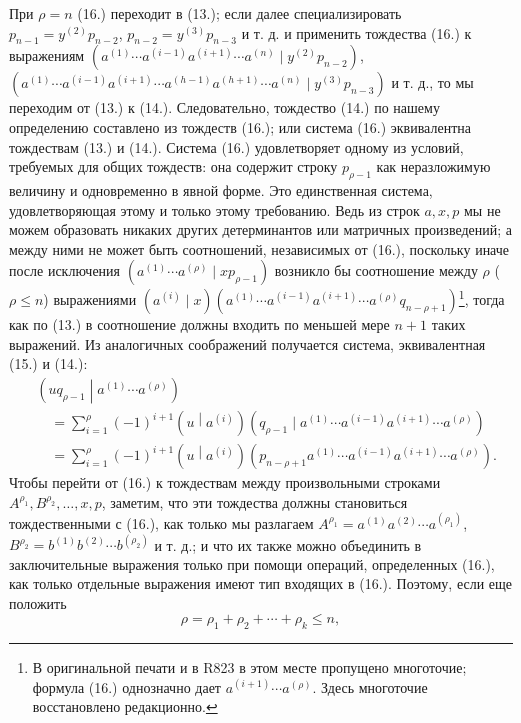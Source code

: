 \documentclass[11pt]{article}
\newcommand{\pair}[2]{\left(#1\middle|#2\right)}
\begin{document}
При $\rho=n$ (16.) переходит в (13.); если далее специализировать $p_{n-1}=y^{(2)}p_{n-2}$, $p_{n-2}=y^{(3)}p_{n-3}$ и т. д. и применить тождества (16.) к выражениям $(a^{(1)}\cdots a^{(i-1)}a^{(i+1)}\cdots a^{(n)}\mid y^{(2)}p_{n-2})$, $(a^{(1)}\cdots a^{(i-1)}a^{(i+1)}\cdots a^{(h-1)}a^{(h+1)}\cdots a^{(n)}\mid y^{(3)}p_{n-3})$ и т. д., то мы переходим от (13.) к (14.). Следовательно, тождество (14.) по нашему определению составлено из тождеств (16.); или система (16.) эквивалентна тождествам (13.) и (14.). Система (16.) удовлетворяет одному из условий, требуемых для общих тождеств: она содержит строку $p_{\rho-1}$ как неразложимую величину и одновременно в явной форме. Это единственная система, удовлетворяющая этому и только этому требованию. Ведь из строк $a,x,p$ мы не можем образовать никаких других детерминантов или матричных произведений; а между ними не может быть соотношений, независимых от (16.), поскольку иначе после исключения $(a^{(1)}\cdots a^{(\rho)}\mid xp_{\rho-1})$ возникло бы соотношение между $\rho$ ($\rho\leq n$) выражениями $(a^{(i)}\mid x)(a^{(1)}\cdots a^{(i-1)}a^{(i+1)}\cdots a^{(\rho)}q_{n-\rho+1})$\footnote{В оригинальной печати и в R823 в этом месте пропущено многоточие; формула (16.) однозначно дает $a^{(i+1)}\cdots a^{(\rho)}$. Здесь многоточие восстановлено редакционно.}, тогда как по (13.) в соотношение должны входить по меньшей мере $n+1$ таких выражений. Из аналогичных соображений получается система, эквивалентная (15.) и (14.):
\begin{equation}
\begin{aligned}
&\pair{u q_{\rho-1}}{a^{(1)}\cdots a^{(\rho)}}\\
&\quad=\sum_{i=1}^{\rho}(-1)^{i+1}\pair{u}{a^{(i)}}
(q_{\rho-1}\mid a^{(1)}\cdots a^{(i-1)}a^{(i+1)}\cdots a^{(\rho)})\\
&\quad=\sum_{i=1}^{\rho}(-1)^{i+1}\pair{u}{a^{(i)}}
(p_{n-\rho+1}a^{(1)}\cdots a^{(i-1)}a^{(i+1)}\cdots a^{(\rho)}).
\end{aligned}
\tag{17}
\end{equation}
Чтобы перейти от (16.) к тождествам между произвольными строками $A^{\rho_1},B^{\rho_2},\ldots,x,p$, заметим, что эти тождества должны становиться тождественными с (16.), как только мы разлагаем $A^{\rho_1}=a^{(1)}a^{(2)}\cdots a^{(\rho_1)}$, $B^{\rho_2}=b^{(1)}b^{(2)}\cdots b^{(\rho_2)}$ и т. д.; и что их также можно объединить в заключительные выражения только при помощи операций, определенных (16.), как только отдельные выражения имеют тип входящих в (16.). Поэтому, если еще положить
\begin{equation}
 \rho=\rho_1+\rho_2+\cdots+\rho_k\le n,
\tag{18}
\end{equation}
\end{document}

